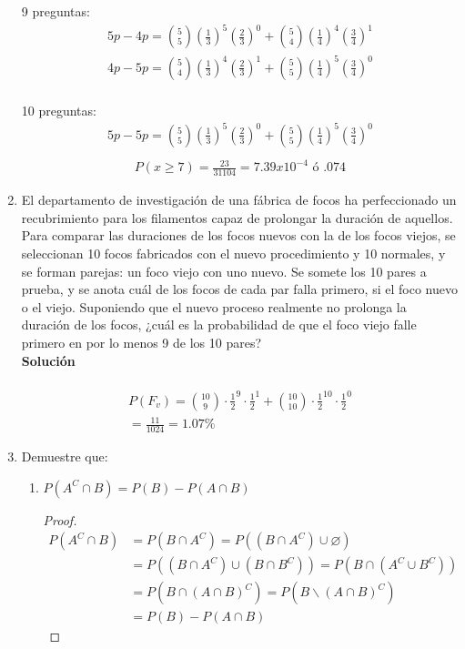 \begin{enumerate}
    9 preguntas:
    \begin{gather*}
    5p-4p = \binom{5}{5}(\frac{1}{3})^{5}(\frac{2}{3})^0 + \binom{5}{4}(\frac{1}{4})^{4}(\frac{3}{4})^1\\
    4p-5p = \binom{5}{4}(\frac{1}{3})^{4}(\frac{2}{3})^1 + \binom{5}{5}(\frac{1}{4})^{5}(\frac{3}{4})^0\\
    \end{gather*}
    
    10 preguntas:
    \begin{gather*}
    5p-5p = \binom{5}{5}(\frac{1}{3})^{5}(\frac{2}{3})^0 + \binom{5}{5}(\frac{1}{4})^{5}(\frac{3}{4})^0\\
    \end{gather*}
    \begin{gather*}
    P(x \ge 7) = \frac{23}{31104} = 7.39x10^{-4} \text{ ó } .074%
    \end{gather*}
    \item El departamento de investigación de una fábrica de focos ha perfeccionado un recubrimiento para los filamentos capaz de prolongar la duración de aquellos. Para comparar las duraciones de los focos nuevos con la de los focos viejos, se seleccionan 10 focos fabricados con el nuevo procedimiento y 10 normales, y se forman parejas: un foco viejo con uno nuevo. Se somete los 10 pares a prueba, y se anota cuál de los focos de cada par falla primero, si el foco nuevo o el viejo. Suponiendo que el nuevo proceso realmente no prolonga la duración de los focos, ¿cuál es la probabilidad de que el foco viejo falle primero en por lo menos 9 de los 10 pares?
    \\\textbf{Solución}
    \\ \\
    \begin{gather*}
    P(F_v) = \binom{10}{9} \cdot \frac{1}{2}^9 \cdot \frac{1}{2}^1 + \binom{10}{10} \cdot \frac{1}{2}^{10} \cdot \frac{1}{2}^0 \\
    = \frac{11}{1024} = 1.07\%
    \end{gather*}
    
    \item Demuestre que:
    \begin{enumerate}
        \item $P(A^C \cap B) = P(B) - P(A \cap B)$
        \begin{proof}
            \begin{align*}
            P(A^C \cap B) &= P(B \cap A^C) = P((B \cap A^C) \cup \diameter) \\
            &= P((B \cap A^C) \cup (B \cap B^C)) = P(B \cap (A^C \cup B^C)) \\
            &= P(B \cap (A \cap B)^C) = P(B \backslash (A \cap B)^C) \\
            &= P(B) - P(A \cap B)
            \end{align*}
        \end{proof}
        

\end{enumerate}
\end{enumerate}
